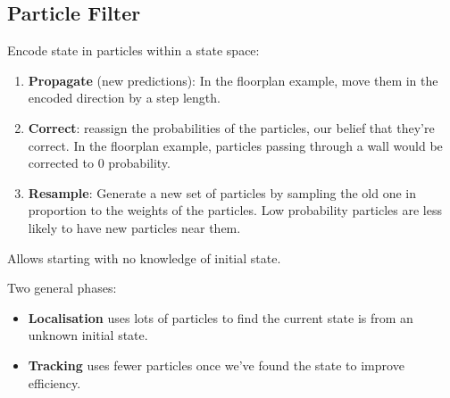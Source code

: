 \documentclass[a4paper, 11pt]{article}
\begin{document}
{    \subsection*{Particle Filter}
    {
        Encode state in particles within a state space:
        \begin{enumerate}
        \item \textbf{Propagate} (new predictions): In the floorplan example, move them in the encoded direction by a step length.
        \item \textbf{Correct}: reassign the probabilities of the particles, our belief that they're correct. In the floorplan example, particles passing through a wall would be corrected to 0 probability.
        \item \textbf{Resample}: Generate a new set of particles by sampling the old one in proportion to the weights of the particles. Low probability particles are less likely to have new particles near them.
        \end{enumerate}

        Allows starting with no knowledge of initial state.

        Two general phases:
        \begin{itemize}
        \item \textbf{Localisation} uses lots of particles to find the current state is from an unknown initial state. 
        \item \textbf{Tracking} uses fewer particles once we've found the state to improve efficiency.
        \end{itemize}
    }
}
\end{document}
